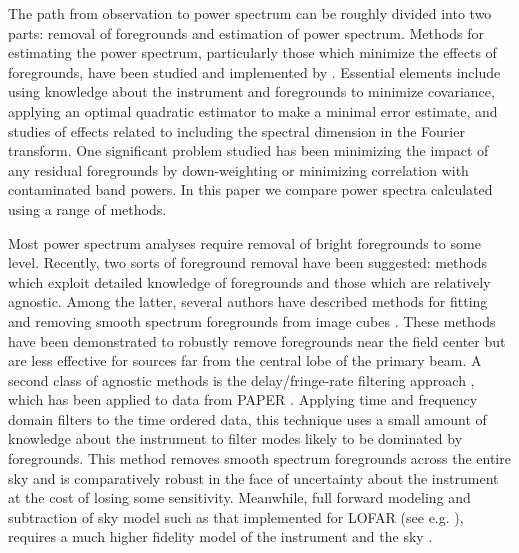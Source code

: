 \documentclass[twolcolumn,iop]{emulateapj}
\begin{document}
The path from observation to power spectrum can be roughly divided into two parts: removal of foregrounds and estimation of power spectrum. 
Methods for estimating the power spectrum, particularly those which minimize the effects of foregrounds, have been studied and implemented by \citet{Morales:2006p1870,Morales:2012p8790,Dillon:2013p10497,Dillon:2014p9788,Liu:2011p8763,Liu:2014p10462,Liu:2014p10463,Trott:2012p10466}. Essential elements include using knowledge about the instrument and foregrounds to minimize covariance, applying an optimal quadratic estimator to make a minimal error estimate, and studies of effects related to including the spectral dimension in the Fourier transform.  One significant problem studied has been minimizing the impact of any residual foregrounds by down-weighting or minimizing correlation with contaminated band powers. In this paper we compare power spectra calculated using a range of methods. 

Most power spectrum analyses require removal of bright foregrounds to some level.  Recently, two sorts of foreground removal have been suggested: methods which exploit detailed knowledge of foregrounds and those which are relatively agnostic. Among the latter, several authors have described methods for fitting and removing smooth spectrum foregrounds from image cubes  \cite{Morales:2006p1903,Bowman:2009p7816,Liu:2009p4762,Liu:2011p8763,Chapman:2013p10379,Dillon:2013p10497,Yatawatta:2013p9699}. These methods have been demonstrated to robustly remove foregrounds near the field center but are less effective for sources far from the central lobe of the primary beam.  A second class of agnostic methods is the delay/fringe-rate filtering approach \citep{Parsons:2012p8896,Liu:2014p10462,Liu:2014p10463}, which has been applied to data from PAPER \citep{Parsons:2014p10499}.  Applying time and frequency domain filters to the time ordered data, this technique uses a small amount of knowledge about the instrument to filter modes likely to be dominated by foregrounds.  This method removes smooth spectrum foregrounds across the entire sky and is comparatively robust in the face of uncertainty about the instrument at the cost of losing some sensitivity.  Meanwhile, full forward modeling and subtraction of sky model such as that implemented for LOFAR (see e.g. \cite{Jelic:2008p2130,Yatawatta:2013p9699}), requires a much higher fidelity model of the instrument and the sky \citep{Datta:2010p8781,Vedantham:2012p10297}.
\end{document}
